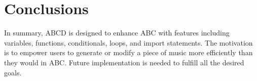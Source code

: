 \section{Conclusions}
In summary, ABCD is designed to enhance ABC with features including variables, functions, conditionals, loops, and import statements. The motivation is to empower users to generate or modify a piece of music more efficiently than they would in ABC.  Future implementation is needed to fulfill all the desired goals.
